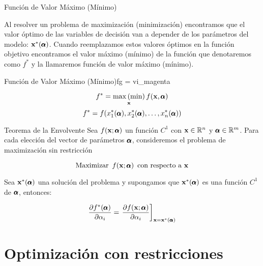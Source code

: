 \documentclass[10pt,aspectratio=169]{beamer}  %
\begin{document}
\begin{frame}{Función de Valor Máximo (Mínimo)}
	
	Al resolver un problema de maximización (minimización) encontramos que el valor óptimo
	de las variables de decisión van a depender de los parámetros del modelo: $\mathbf{x}^*(\pmb{\alpha})$. Cuando 
	reemplazamos estos valores óptimos en la función objetivo encontramos el valor máximo (mínimo) de la función 
	que denotaremos como $f^*$ y la llamaremos función de valor máximo (mínimo). 
	\vspace{10pt}

	\begin{varblock}{Función de Valor Máximo (Mínimo)}{fg = vi_magenta}
	  
		\[ f^* = \underset{\mathbf{x}}{\max \, (\min)} \, f(\mathbf{x}, \pmb{\alpha}) \]
%
		\[f^* = f(x_1^*(\pmb{\alpha}), x_2^*(\pmb{\alpha}), \dots, x_n^*(\pmb{\alpha}))\]
	\end{varblock}

\end{frame}


\begin{frame}{Teorema de la Envolvente}
	Sea $f(\mathbf{x};\pmb{\alpha})$ un función $C^1$ con $\mathbf{x} \in \mathbb{R}^n$ y $\pmb{\alpha} \in \mathbb{R}^m$. Para cada elección del 
	vector de parámetros $\pmb{\alpha}$, consideremos el problema de maximización sin restricción

	\[ \text{Maximizar } \, f(\mathbf{x};\pmb{\alpha}) \, \text{ con respecto a } \mathbf{x} \]
	
	Sea $\mathbf{x}^*(\pmb{\alpha})$ una solución del problema y supongamos que $\mathbf{x}^*(\pmb{\alpha})$ es una función $C^1$ de $\pmb{\alpha}$,
	entonces:

	\[ \frac{\partial f^*(\pmb{\alpha})}{\partial \alpha_i} = 
	\left. \frac{\partial f(\mathbf{x}; \pmb{\alpha})}{\partial \alpha_i} \right]_{\mathbf{x} = \mathbf{x}^*(\pmb{\alpha})} \]


\end{frame}


% 
\section{Optimización con restricciones}
\end{document}
